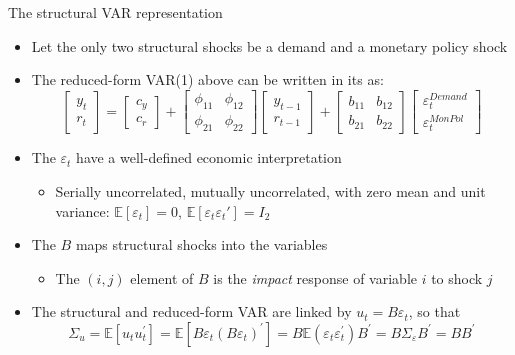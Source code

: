 \documentclass[10pt,handout]{beamer}
\begin{document}
\begin{frame}
{The structural VAR representation}
\begin{itemize}
\item Let the only two structural shocks be a demand and a monetary policy shock \bigskip
\item The reduced-form VAR(1) above can be written in its  as:
\begin{equation*}
\begin{bmatrix}
y_{t} \\
r_{t}%
\end{bmatrix}%
=%
\begin{bmatrix}
c_{y} \\
c_{r}
\end{bmatrix}%
+
\begin{bmatrix}
\phi _{11} & \phi _{12} \\
\phi _{21} & \phi _{22}%
\end{bmatrix}%
\begin{bmatrix}
y_{t-1} \\
r_{t-1}%
\end{bmatrix}%
+%
\begin{bmatrix}
b_{11} & b_{12} \\
b_{21} & b_{22}%
\end{bmatrix}%
\begin{bmatrix}
\varepsilon_{t}^{Demand} \\
\varepsilon_{t}^{MonPol}%
\end{bmatrix}%
\end{equation*}%
\smallskip
\item The  $\varepsilon_t$ have a well-defined economic interpretation
\smallskip
\begin{itemize}
\item Serially uncorrelated, mutually uncorrelated, with zero mean and unit variance: $\mathbb{E}[\varepsilon_t]=0$, $\mathbb{E}[\varepsilon_t\varepsilon_t']=I_2$ \medskip
\end{itemize}
\item The   $B$ maps structural shocks into the variables \smallskip
\begin{itemize}
\item The $(i,j)$ element of $B$ is the \textit{impact} response of variable $i$ to shock $j$ \medskip
\end{itemize}\pause \bigskip
\item The structural and reduced-form VAR are linked by $u_t = B\varepsilon_t$, so that 
\begin{equation*}
\Sigma_{u}=\mathbb{E}\left[ u_{t}u_{t}^{\prime}\right] =\mathbb{E}\left[B\varepsilon_{t}\left( B\varepsilon_{t}\right) ^{\prime}\right] =B\mathbb{E}(\varepsilon_{t}\varepsilon_{t}^{\prime})B^{\prime}=B\Sigma_{\varepsilon }B^{\prime}=BB^{\prime}
\end{equation*}
\end{itemize}
\end{frame}
\shownotesblock{}
\end{document}
